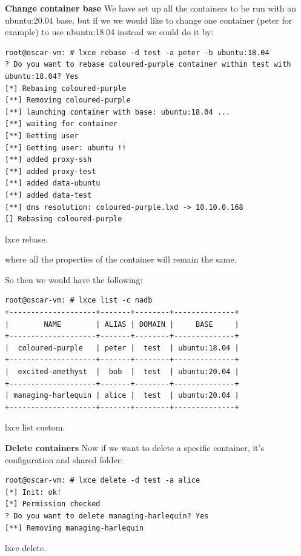 \textbf{Change container base}
We have set up all the containers to be run with an ubuntu:20.04 base, but if we we would like to change one container (peter for example) to use ubuntu:18.04 instead we could do it by:
\begin{listing}[H]
\begin{verbatim}
root@oscar-vm: # lxce rebase -d test -a peter -b ubuntu:18.04
? Do you want to rebase coloured-purple container within test with ubuntu:18.04? Yes
[*] Rebasing coloured-purple
[**] Removing coloured-purple
[**] launching container with base: ubuntu:18.04 ...
[**] waiting for container
[**] Getting user
[**] Getting user: ubuntu !!
[**] added proxy-ssh
[**] added proxy-test
[**] added data-ubuntu
[**] added data-test
[**] dns resolution: coloured-purple.lxd -> 10.10.0.168
[] Rebasing coloured-purple
\end{verbatim}
\caption[lxce rebase]{\footnotesize{lxce rebase.}}
\end{listing}
where all the properties of the container will remain the same.

So then we would have the following:
\begin{listing}[H]
\begin{verbatim}
root@oscar-vm: # lxce list -c nadb
+--------------------+-------+--------+--------------+
|        NAME        | ALIAS | DOMAIN |     BASE     |
+--------------------+-------+--------+--------------+
|  coloured-purple   | peter |  test  | ubuntu:18.04 |
+--------------------+-------+--------+--------------+
|  excited-amethyst  |  bob  |  test  | ubuntu:20.04 |
+--------------------+-------+--------+--------------+
| managing-harlequin | alice |  test  | ubuntu:20.04 |
+--------------------+-------+--------+--------------+
\end{verbatim}
\caption[lxce list custom]{\footnotesize{lxce list custom.}}
\end{listing}

\textbf{Delete containers}
Now if we want to delete a specific container, it's configuration and shared folder:

\begin{listing}[H]
\begin{verbatim}
root@oscar-vm: # lxce delete -d test -a alice
[*] Init: ok!
[*] Permission checked
? Do you want to delete managing-harlequin? Yes
[**] Removing managing-harlequin
\end{verbatim}
\caption[lxce delete]{\footnotesize{lxce delete.}}
\end{listing}

